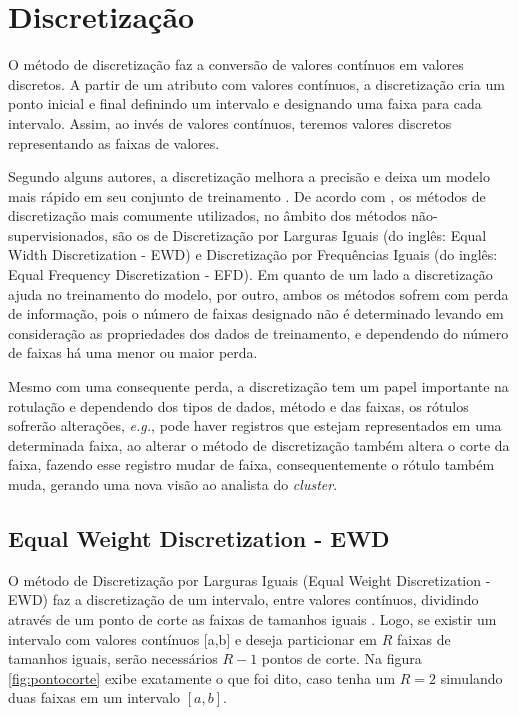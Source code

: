 \section{Discretização}\label{cap:refTeor:sec:discret}

O método de discretização faz a conversão de valores contínuos em valores discretos. A partir de um atributo com valores contínuos, a discretização cria um ponto inicial e final definindo um intervalo e designando uma faixa para cada intervalo. Assim, ao invés de valores contínuos, teremos valores discretos representando as faixas de valores. 

Segundo alguns autores, a discretização melhora a precisão e deixa um modelo mais rápido em seu conjunto de treinamento \cite{Catlett2006b,Hwang2002}. De acordo com \cite{Kotsiantis2006, Dougherty1995}, os métodos de discretização mais comumente utilizados, no âmbito dos métodos não-supervisionados, são os de Discretização por Larguras Iguais (do inglês: Equal Width Discretization - EWD) e Discretização por Frequências Iguais (do inglês: Equal Frequency Discretization - EFD). Em quanto de um lado a discretização ajuda no treinamento do modelo, por outro, ambos os métodos sofrem com perda de informação, pois o número de faixas designado não é determinado levando em consideração as propriedades dos dados de treinamento, e dependendo do número de faixas há uma menor ou maior perda. 

Mesmo com uma consequente perda, a discretização tem um papel importante na rotulação e dependendo dos tipos de dados, método e das faixas, os rótulos sofrerão alterações, \textit{e.g.}, pode haver registros que estejam representados em uma determinada faixa, ao alterar o método de discretização também altera o corte da faixa, fazendo esse registro mudar de faixa, consequentemente o rótulo também muda, gerando uma nova visão ao analista do \textit{cluster}. 





\subsection{Equal Weight Discretization - EWD}\label{cap:refTeor:subsec:ewd}

O método de Discretização por Larguras Iguais (Equal Weight Discretization - EWD) faz a discretização de um intervalo, entre valores contínuos, dividindo através de um ponto de corte as faixas de tamanhos iguais \cite{Baron2016,Yang2002}. Logo, se existir um intervalo com valores contínuos [a,b] e deseja particionar em ${R}$ faixas de tamanhos iguais, serão necessários ${R-1}$ pontos de corte. Na figura \ref{fig:pontocorte} exibe exatamente o que foi dito, caso tenha um ${R=2}$ simulando duas faixas em um intervalo ${[a,b]}$.


